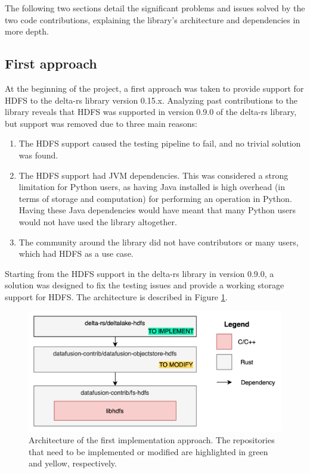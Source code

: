 The following two sections detail the significant problems and issues solved by the two code contributions, explaining the library's architecture and dependencies in more depth.

\subsection{First approach}
At the beginning of the project, a first approach was taken to provide support for \gls{HDFS} to the delta-rs library version 0.15.x. Analyzing past contributions to the library reveals that \gls{HDFS} was supported in version 0.9.0 of the delta-rs library, but support was removed due to three main reasons:
\begin{enumerate}
  \item The \gls{HDFS} support caused the testing pipeline to fail, and no trivial solution was found.
  \item The \gls{HDFS} support had \gls{JVM} dependencies. This was considered a strong limitation for Python users, as having Java installed is high overhead (in terms of storage and computation) for performing an operation in Python. Having these Java dependencies would have meant that many Python users would not have used the library altogether.
  \item The community around the library did not have contributors or many users, which had \gls{HDFS} as a use case.
\end{enumerate}
Starting from the \gls{HDFS} support in the delta-rs library in version 0.9.0, a solution was designed to fix the testing issues and provide a working storage support for \gls{HDFS}. The architecture is described in Figure \ref{fig:approach_1_solution_schema}. 

\begin{figure}[!ht]
  \begin{center}
    \includegraphics[width=\textwidth]{figures/4-implementation/approach1_solution_schema.png}
  \caption[First solution architecture]{Architecture of the first implementation approach. The repositories that need to be implemented or modified are highlighted in green and yellow, respectively.}
  \label{fig:approach_1_solution_schema}
  \end{center}
\end{figure}


